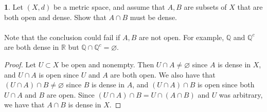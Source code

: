 \documentclass[12pt]{article}
\theoremstyle{definition}
\newtheorem{ex}{}
\begin{document}
\begin{ex}
	Let $(X, d)$ be a metric space, and assume that $A, B$ are subsets of $X$ that are both open and dense.
	Show that $A \cap B$ must be dense.
	\\\\
	Note that the conclusion could fail if $A, B$ are not open.
	For example, $\mathbb{Q}$ and $\mathbb{Q}^c$ are both dense in $\mathbb{R}$ but $\mathbb{Q} \cap \mathbb{Q}^c = \varnothing$.
\end{ex}
\begin{proof}
  Let $U \subset X$ be open and nonempty.
  Then $U \cap A \neq \varnothing$ since $A$ is dense in $X$, and $U \cap A$ is open since $U$ and $A$ are both open.
  We also have that $(U \cap A) \cap B \neq \varnothing$ since $B$ is dense in $A$, and $(U \cap A) \cap B$ is open since both $U \cap A$ and $B$ are open.
  Since $(U \cap A) \cap B = U \cap (A \cap B)$ and $U$ was arbitrary, we have that $A \cap B$ is dense in $X$.
\end{proof}
\end{document}
